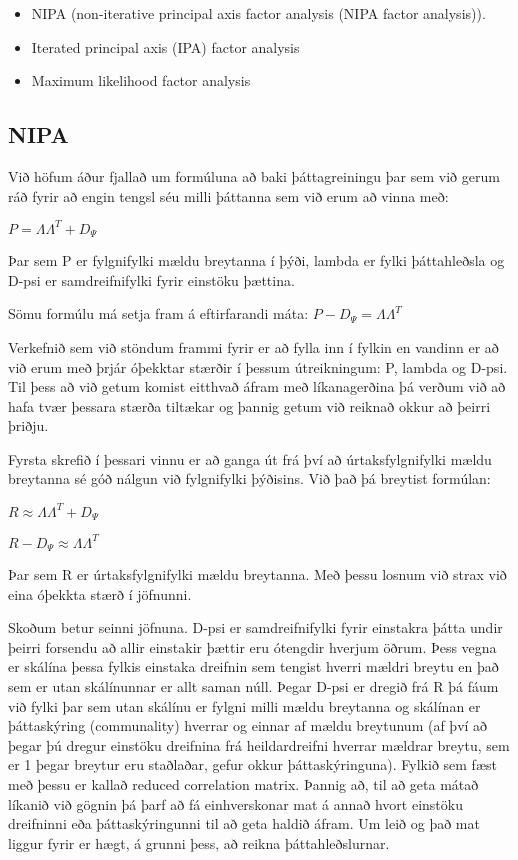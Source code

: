 \documentclass[]{book}
\providecommand{\tightlist}{%
  \setlength{\itemsep}{0pt}\setlength{\parskip}{0pt}}
\begin{document}
\begin{itemize}
\tightlist
\item
  NIPA (non-iterative principal axis factor analysis (NIPA factor analysis)).
\item
  Iterated principal axis (IPA) factor analysis
\item
  Maximum likelihood factor analysis
\end{itemize}

\hypertarget{nipa}{%
\subsection{NIPA}\label{nipa}}

Við höfum áður fjallað um formúluna að baki þáttagreiningu þar sem við gerum ráð fyrir að engin tengsl séu milli þáttanna sem við erum að vinna með:

\(P = \Lambda \Lambda^{T}+D_{\Psi}\)

Þar sem P er fylgnifylki mældu breytanna í þýði, lambda er fylki þáttahleðsla og D-psi er samdreifnifylki fyrir einstöku þættina.

Sömu formúlu má setja fram á eftirfarandi máta:
\(P-D_{\Psi} = \Lambda \Lambda^{T}\)

Verkefnið sem við stöndum frammi fyrir er að fylla inn í fylkin en vandinn er að við erum með þrjár óþekktar stærðir í þessum útreikningum: P, lambda og D-psi. Til þess að við getum komist eitthvað áfram með líkanagerðina þá verðum við að hafa tvær þessara stærða tiltækar og þannig getum við reiknað okkur að þeirri þriðju.

Fyrsta skrefið í þessari vinnu er að ganga út frá því að úrtaksfylgnifylki mældu breytanna sé góð nálgun við fylgnifylki þýðisins. Við það þá breytist formúlan:

\(R \approx \Lambda \Lambda^{T}+D_{\Psi}\)

\(R-D_{\Psi} \approx \Lambda \Lambda^{T}\)

Þar sem R er úrtaksfylgnifylki mældu breytanna. Með þessu losnum við strax við eina óþekkta stærð í jöfnunni.

Skoðum betur seinni jöfnuna. D-psi er samdreifnifylki fyrir einstakra þátta undir þeirri forsendu að allir einstakir þættir eru ótengdir hverjum öðrum. Þess vegna er skálína þessa fylkis einstaka dreifnin sem tengist hverri mældri breytu en það sem er utan skálínunnar er allt saman núll. Þegar D-psi er dregið frá R þá fáum við fylki þar sem utan skálínu er fylgni milli mældu breytanna og skálínan er þáttaskýring (communality) hverrar og einnar af mældu breytunum (af því að þegar þú dregur einstöku dreifnina frá heildardreifni hverrar mældrar breytu, sem er 1 þegar breytur eru staðlaðar, gefur okkur þáttaskýringuna). Fylkið sem fæst með þessu er kallað reduced correlation matrix. Þannig að, til að geta mátað líkanið við gögnin þá þarf að fá einhverskonar mat á annað hvort einstöku dreifninni eða þáttaskýringunni til að geta haldið áfram. Um leið og það mat liggur fyrir er hægt, á grunni þess, að reikna þáttahleðslurnar.
\end{document}

